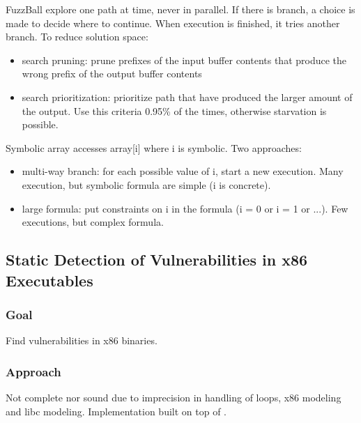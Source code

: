 \documentclass[10pt, a4paper]{article}
\begin{document}
FuzzBall explore one path at time, never in parallel. If there is branch, a choice is made to decide where to continue. When execution is finished, it tries another branch. To reduce solution space:
\begin{itemize}
  \item search pruning: prune prefixes of the input buffer contents that produce the wrong prefix of the output buffer contents
  \item search prioritization: prioritize path that have produced the larger amount of the output. Use this criteria 0.95\% of the times, otherwise starvation is possible.
\end{itemize}

Symbolic array accesses array[i] where i is symbolic. Two approaches:
\begin{itemize}
  \item multi-way branch: for each possible value of i, start a new execution. Many execution, but symbolic formula are simple (i is concrete).
  \item large formula: put constraints on i in the formula (i = 0 or i = 1 or ...). Few executions, but complex formula.
\end{itemize}

\subsection{\cite{CFB-ACSAC06} Static Detection of Vulnerabilities in x86 Executables} 

\subsubsection{Goal}
Find vulnerabilities in x86 binaries.

\subsubsection{Approach}
Not complete nor sound due to imprecision in handling of loops, x86 modeling and libc modeling.
Implementation built on top of \cite{KKM-USEC05}.
\end{document}
